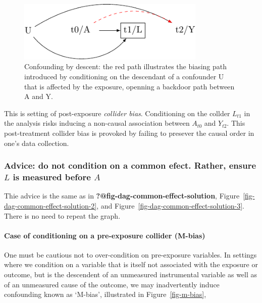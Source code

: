 \documentclass[
  singlecolumn,
  9pt]{article}
\let\oldparagraph\paragraph
\renewcommand{\paragraph}[1]{\oldparagraph{#1}\mbox{}}
\begin{document}
\begin{figure}

{\centering \includegraphics[width=0.8\textwidth,height=\textheight]{causal-dags_files/figure-pdf/fig-dag-descendent-1.pdf}

}

\caption{\label{fig-dag-descendent}Confounding by descent: the red path
illustrates the biasing path introduced by conditioning on the
descendant of a confounder U that is affected by the exposure, openning
a backdoor path between A and Y.}

\end{figure}

This is setting of post-exposure \emph{collider bias}. Conditioning on
the collder \(L_{t1}\) in the analysis risks inducing a non-causal
association between \(A_{t0}\) and \(Y_{t2}\). This post-treatment
collider bias is provoked by failing to presever the causal order in
one's data collection.

\subsubsection{\texorpdfstring{Advice: do not condition on a common
efect. Rather, ensure \(L\) is measured before
\(A\)}{Advice: do not condition on a common efect. Rather, ensure L is measured before A}}\label{advice-do-not-condition-on-a-common-efect.-rather-ensure-l-is-measured-before-a-1}

Thie advice is the same as in \textbf{?@fig-dag-common-effect-solution},
Figure~\ref{fig-dag-common-effect-solution-2}, and
Figure~\ref{fig-dag-common-effect-solution-3}. There is no need to
repeat the graph.

\paragraph{Case of conditioning on a pre-exposure collider
(M-bias)}\label{case-of-conditioning-on-a-pre-exposure-collider-m-bias}

One must be cautious not to over-condition on pre-exposure variables. In
settings where we condition on a variable that is itself not associated
with the exposure or outcome, but is the descendent of an unmeasured
instrumental variable as well as of an unmeasured cause of the outcome,
we may inadvertently induce confounding known as `M-bias', illustrated
in Figure~\ref{fig-m-bias},
\end{document}
